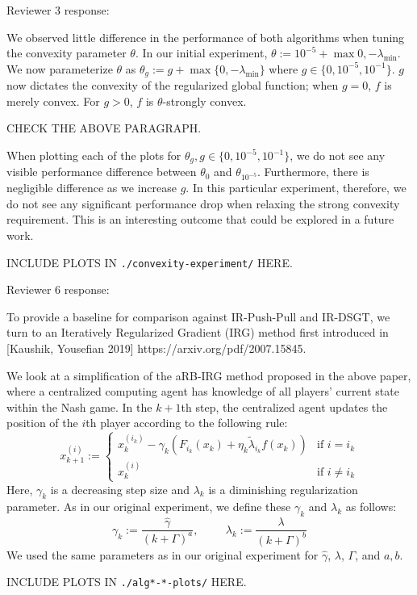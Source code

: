 Reviewer 3 response:

We observed little difference in the performance of both algorithms when tuning the convexity parameter $\theta$. In our initial experiment, $\theta := 10^{-5} + \max{0, -\lambda_{\min}}$. We now parameterize $\theta$ as $\theta_g := g + \max\{0, -\lambda_{\min}\}$ where $g \in \{0, 10^{-5}, 10^{-1}\}$. $g$ now dictates the convexity of the regularized global function; when $g = 0$, $f$ is merely convex. For $g > 0$, $f$ is $\theta$-strongly convex.

CHECK THE ABOVE PARAGRAPH.

When plotting each of the plots for $\theta_g, g \in \{0, 10^{-5}, 10^{-1}\}$, we do not see any visible performance difference between $\theta_0$ and $\theta_{10^{-5}}$. Furthermore, there is negligible difference as we increase $g$. In this particular experiment, therefore, we do not see any significant performance drop when relaxing the strong convexity requirement. This is an interesting outcome that could be explored in a future work.

INCLUDE PLOTS IN \texttt{./convexity-experiment/} HERE.


Reviewer 6 response:

To provide a baseline for comparison against IR-Push-Pull and IR-DSGT, we turn to an Iteratively Regularized Gradient (IRG) method first introduced in [Kaushik, Yousefian 2019] https://arxiv.org/pdf/2007.15845.

We look at a simplification of the aRB-IRG method proposed in the above paper, where a centralized computing agent has knowledge of all players' current state within the Nash game. In the $k+1$th step, the centralized agent updates the position of the $i$th player according to the following rule:
\[
x_{k+1}^{(i)} := \begin{cases}
    x_k^{(i_k)} - \gamma_k \left( F_{i_k}(x_k) + \eta_k \tilde{\lambda}_{i_k} f(x_k) \right) & \text{if } i = i_k \\
    x_{k}^{(i)} & \text{if } i \neq i_k
\end{cases}
\]
Here, $\gamma_k$ is a decreasing step size and $\lambda_k$ is a diminishing regularization parameter. As in our original experiment, we define these $\gamma_k$ and $\lambda_k$ as follows:
\[
\gamma_k := \frac{\hat{\gamma}}{(k + \Gamma)^a}, \hspace{1cm} \lambda_k := \frac{\lambda}{(k+\Gamma)^b}
\]
We used the same parameters as in our original experiment for $\hat{\gamma}$, $\lambda$, $\Gamma$, and $a, b$.

INCLUDE PLOTS IN \texttt{./alg*-*-plots/} HERE.